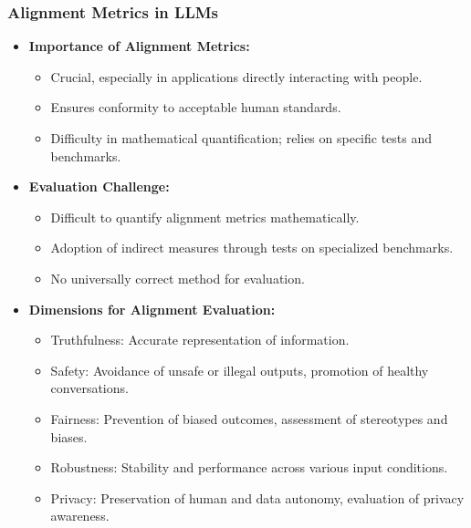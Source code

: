 \begin{frame}[fragile]\frametitle{Alignment Metrics in LLMs}
  \begin{itemize}
    \item \textbf{Importance of Alignment Metrics:}
      \begin{itemize}
        \item Crucial, especially in applications directly interacting with people.
        \item Ensures conformity to acceptable human standards.
        \item Difficulty in mathematical quantification; relies on specific tests and benchmarks.
      \end{itemize}
    \item \textbf{Evaluation Challenge:}
      \begin{itemize}
        \item Difficult to quantify alignment metrics mathematically.
        \item Adoption of indirect measures through tests on specialized benchmarks.
        \item No universally correct method for evaluation.
      \end{itemize}
    \item \textbf{Dimensions for Alignment Evaluation:}
      \begin{itemize}
        \item Truthfulness: Accurate representation of information.
        \item Safety: Avoidance of unsafe or illegal outputs, promotion of healthy conversations.
        \item Fairness: Prevention of biased outcomes, assessment of stereotypes and biases.
        \item Robustness: Stability and performance across various input conditions.
        \item Privacy: Preservation of human and data autonomy, evaluation of privacy awareness.
      \end{itemize}
  \end{itemize}
\end{frame}

